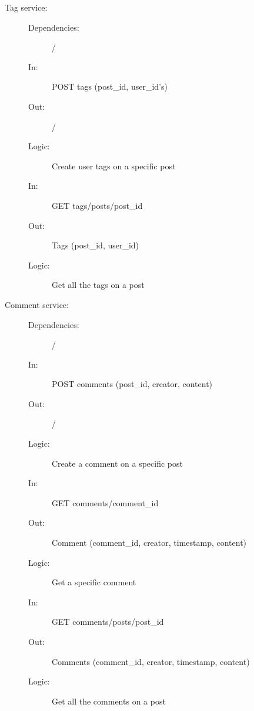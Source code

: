 \documentclass{article}
\begin{document}
\begin{description}
    \item [Tag service:]
    \begin{description}
        \item[]
        \item[Dependencies:] /
    \end{description}
    \begin{description}
        \item[]
        \item[In:] POST tags (post\_id, user\_id's)
        \item[Out:] /
        \item[Logic:] Create user tags on a specific post
        \item[]

        \item[In:] GET tags/posts/post\_id
        \item[Out:] Tags (post\_id, user\_id)
        \item[Logic:] Get all the tags on a post
        \item[]
    \end{description}
\end{description}

\begin{description}
    \item [Comment service:]
    \begin{description}
        \item[]
        \item[Dependencies:] /
    \end{description}
    \begin{description}
        \item[]
        \item[In:] POST comments (post\_id, creator, content)
        \item[Out:] /
        \item[Logic:] Create a comment on a specific post
        \item[]
        
        \item[In:] GET comments/comment\_id
        \item[Out:] Comment (comment\_id, creator, timestamp, content)
        \item[Logic:] Get a specific comment
        \item[]

        \item[In:] GET comments/posts/post\_id
        \item[Out:] Comments (comment\_id, creator, timestamp, content)
        \item[Logic:] Get all the comments on a post
        \item[]
    \end{description}
\end{description}
\end{document}
